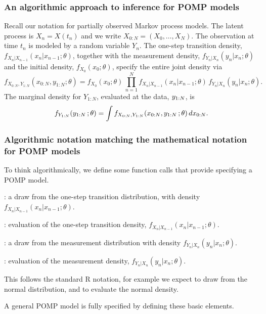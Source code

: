 \documentclass{beamer}\usepackage[]{graphicx}\usepackage[]{color}
\begin{document}
\begin{frame}[fragile] 

\frametitle{An algorithmic approach to inference for POMP models}

Recall our notation for partially observed Markov process models. The latent process is $X_n=X(t_n)$ and we write $X_{0:N}=(X_0,\dots,X_N)$. The observation at time $t_n$ is modeled by a random variable $Y_n$. The one-step transition density, $f_{X_n|X_{n-1}}(x_n|x_{n-1};\theta)$, together with the measurement density, $f_{Y_n|X_n}(y_n|x_n;\theta)$ and the initial density, $f_{X_0}(x_0;\theta)$, specify the entire joint density via
$$f_{X_{0:N},Y_{1:N}}(x_{0:N},y_{1:N};\theta) = f_{X_0}(x_0;\theta)\,\prod_{n=1}^N\!f_{X_n | X_{n-1}}(x_n|x_{n-1};\theta)\,f_{Y_n|X_n}(y_n|x_n;\theta).$$
The marginal density for $Y_{1:N}$, evaluated at the data, $y_{1:N}$, is
$$ f_{Y_{1:N}}(y_{1:N}\,;\theta)=\int f_{X_{0:N},Y_{1:N}}(x_{0:N},y_{1:N}\,;\theta)\, dx_{0:N}.
$$


\vspace{2mm}

\end{frame}

\begin{frame}[fragile]

\frametitle{Algorithmic notation matching the mathematical notation for POMP models}

To think algorithmically, we define some function calls that provide  specifying a POMP model.

\bi
\item {}: a draw from the one-step transition distribution, with density $f_{X_n|X_{n-1}}(x_n| x_{n-1};\theta)$.

\item {}: evaluation of the one-step transition density, $f_{X_n|X_{n-1}}(x_n| x_{n-1};\theta)$.

\item {}: a draw from the measurement distribution with density $f_{Y_n|X_n}(y_n| x_n;\theta)$.

\item {}: evaluation of the measurement density, $f_{Y_n|X_n}(y_n| x_n;\theta)$.

\item This follows the standard R notation, for example we expect  to draw from the normal distribution, and  to evaluate the normal density.

\item A general POMP model is fully specified by defining these basic elements.

\ei

\end{frame}
\end{document}
